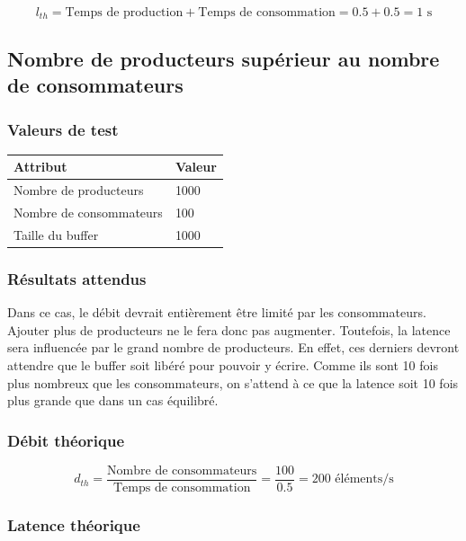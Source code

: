 \documentclass[
  french,
  a4paper,
]{scrartcl}
\begin{document}
$$
l_{th} = \text{Temps de production} + \text{Temps de consommation} = 0.5 + 0.5 = 1 \text{ s}
$$

\subsection{Nombre de producteurs supérieur au nombre de consommateurs}

\subsubsection*{Valeurs de test}

\begin{table}[h]
  \centering
  \begin{tabular}{l|l}
    \textbf{Attribut}  & \textbf{Valeur} \\
    \hline
    Nombre de producteurs & 1000 \\
    Nombre de consommateurs & 100 \\
    Taille du buffer & 1000 \\
  \end{tabular}
\end{table}

\subsubsection*{Résultats attendus}

Dans ce cas, le débit devrait entièrement être limité par les consommateurs. Ajouter plus de 
producteurs ne le fera donc pas augmenter. Toutefois, la latence sera influencée par le grand 
nombre de producteurs. En effet, ces derniers devront attendre que le buffer soit libéré pour
pouvoir y écrire. Comme ils sont 10 fois plus nombreux que les consommateurs, on s'attend 
à ce que la latence soit 10 fois plus grande que dans un cas équilibré.

\subsubsection*{Débit théorique}

$$
d_{th} = \frac{\text{Nombre de consommateurs}}{\text{Temps de consommation}} = \frac{100}{0.5} = 200 \text{ éléments/s}
$$

\subsubsection*{Latence théorique}
\end{document}
